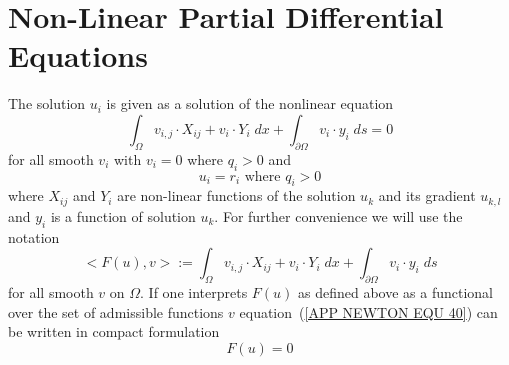 \chapter{Non-Linear Partial Differential Equations}
\label{APP: NEWTON}

The solution $u_i$ is given as a solution of
the nonlinear equation
\begin{equation} \label{APP NEWTON EQU 40}
\int_{\Omega} v_{i,j} \cdot X_{ij} + v_{i} \cdot Y_{i} \; dx
+ \int_{\partial \Omega}  v_{i} \cdot y_{i} \; ds  = 0 
\end{equation}
for all smooth $v_i$ with $v_i=0$ where $q_i>0$ and
\begin{equation} \label{APP NEWTON EQU 40b}
u_i=r_i \mbox{ where } q_i>0
\end{equation}
where $X_{ij}$ and $Y_i$ are non-linear functions of the solution $u_k$ and its gradient $u_{k,l}$
and $y_i$ is a function of solution $u_k$. For further convenience we will use the 
notation  
\begin{equation} \label{APP NEWTON EQU 40c}
<F(u),v> :=\int_{\Omega} v_{i,j} \cdot X_{ij} + v_{i} \cdot Y_{i} \; dx
+ \int_{\partial \Omega}  v_{i} \cdot y_{i} \; ds
\end{equation}
for all smooth $v$ on $\Omega$. If one interprets $F(u)$ as defined above as a functional 
over the set of admissible functions $v$  
equation~(\ref{APP NEWTON EQU 40}) can be written in compact formulation
\begin{equation} \label{APP NEWTON EQU 40d}
F(u)= 0 
\end{equation}

